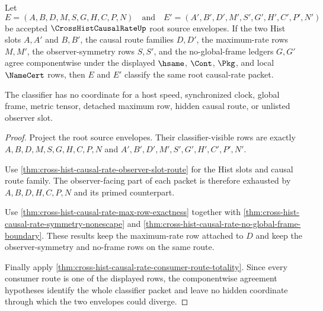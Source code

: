 \begin{theorem}
\label{thm:cross-hist-causal-rate-root-classifier-stability}
Let
$$
E=(A,B,D,M,S,G,H,C,P,N)
\quad\text{and}\quad
E'=(A',B',D',M',S',G',H',C',P',N')
$$
be accepted $\CrossHistCausalRateUp$ root source envelopes. If the two Hist
slots $A,A'$ and $B,B'$, the causal route families $D,D'$, the maximum-rate
rows $M,M'$, the observer-symmetry rows $S,S'$, and the no-global-frame ledgers
$G,G'$ agree componentwise under the displayed $\hsame$, $\Cont$, $\Pkg$, and
local $\NameCert$ rows, then $E$ and $E'$ classify the same root
causal-rate packet.

The classifier has no coordinate for a host speed, synchronized clock, global
frame, metric tensor, detached maximum row, hidden causal route, or unlisted
observer slot.
\end{theorem}
\begin{proof}
Project the root source envelopes. Their classifier-visible rows are exactly
$A,B,D,M,S,G,H,C,P,N$ and $A',B',D',M',S',G',H',C',P',N'$.

Use \autoref{thm:cross-hist-causal-rate-observer-slot-route} for the Hist
slots and causal route family. The observer-facing part of each packet is
therefore exhausted by $A,B,D,H,C,P,N$ and its primed counterpart.

Use \autoref{thm:cross-hist-causal-rate-max-row-exactness} together with
\autoref{thm:cross-hist-causal-rate-symmetry-nonescape} and
\autoref{thm:cross-hist-causal-rate-no-global-frame-boundary}. These results
keep the maximum-rate row attached to $D$ and keep the observer-symmetry and
no-frame rows on the same route.

Finally apply \autoref{thm:cross-hist-causal-rate-consumer-route-totality}.
Since every consumer route is one of the displayed rows, the componentwise
agreement hypotheses identify the whole classifier packet and leave no hidden
coordinate through which the two envelopes could diverge.
\end{proof}

